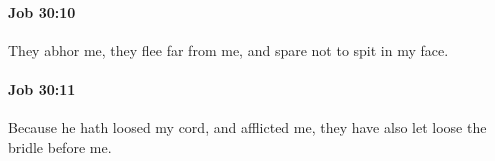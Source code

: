 		\paragraph{Job 30:10} %
			\label{JOB-30-10}

			They abhor me, they flee far from me, and spare not to spit in my face.


		\paragraph{Job 30:11} %
			\label{JOB-30-11}

			Because he hath loosed my cord, and afflicted me, they have also let loose the bridle before me.


